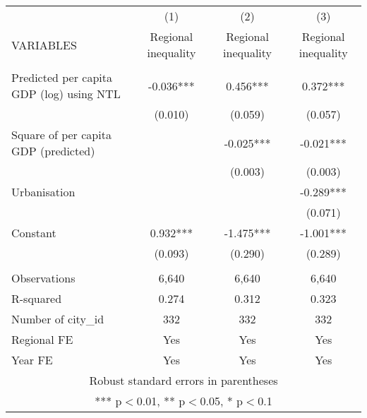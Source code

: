 \documentclass[]{article}
\begin{document}
\begin{tabular}{lccc} \hline
 & (1) & (2) & (3) \\
VARIABLES & Regional inequality & Regional inequality & Regional inequality \\ \hline
 &  &  &  \\
Predicted per capita GDP (log) using NTL & -0.036*** & 0.456*** & 0.372*** \\
 & (0.010) & (0.059) & (0.057) \\
Square of per capita GDP (predicted) &  & -0.025*** & -0.021*** \\
 &  & (0.003) & (0.003) \\
Urbanisation &  &  & -0.289*** \\
 &  &  & (0.071) \\
Constant & 0.932*** & -1.475*** & -1.001*** \\
 & (0.093) & (0.290) & (0.289) \\
 &  &  &  \\
Observations & 6,640 & 6,640 & 6,640 \\
R-squared & 0.274 & 0.312 & 0.323 \\
Number of city\_id & 332 & 332 & 332 \\
Regional FE & Yes & Yes & Yes \\
 Year FE & Yes & Yes & Yes \\ \hline
\multicolumn{4}{c}{ Robust standard errors in parentheses} \\
\multicolumn{4}{c}{ *** p$<$0.01, ** p$<$0.05, * p$<$0.1} \\
\end{tabular}
\end{document}
